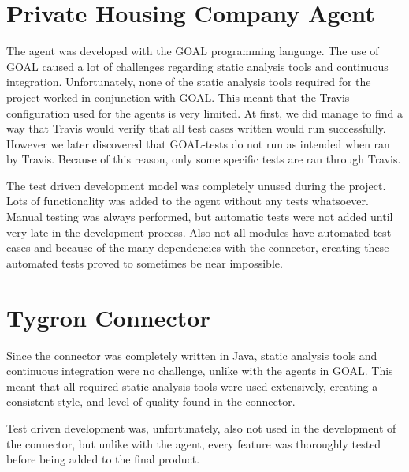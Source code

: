 \section{Private Housing Company Agent}
\label{sec:Private Housing Company Agent}

The agent was developed with the GOAL programming language. The use of GOAL caused a lot of challenges regarding static analysis tools and continuous integration.
Unfortunately, none of the static analysis tools required for the project worked in conjunction with GOAL. This meant that the Travis configuration used for the agents is very limited.
At first, we did manage to find a way that Travis would verify that all test cases written would run successfully. However we later discovered that GOAL-tests do not run as intended when ran by Travis.
Because of this reason, only some specific tests are ran through Travis.

The test driven development model was completely unused during the project. Lots of functionality was added to the agent without any tests whatsoever. Manual testing was always performed, but automatic
tests were not added until very late in the development process. Also not all modules have automated test cases and because of the many dependencies with the connector, creating these automated tests proved
to sometimes be near impossible.

\section{Tygron Connector}
\label{sec:Tygron Connector}

Since the connector was completely written in Java, static analysis tools and continuous integration were no challenge, unlike with the agents in GOAL. This meant that all required static analysis tools were
used extensively, creating a consistent style, and level of quality found in the connector.

Test driven development was, unfortunately, also not used in the development of the connector, but unlike with the agent, every feature was thoroughly tested before being added to the final product.
